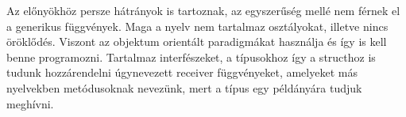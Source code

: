 Az előnyökhöz persze hátrányok is tartoznak, az egyszerűség mellé nem férnek el a generikus függvények.
Maga a nyelv nem tartalmaz osztályokat, illetve nincs öröklődés.
Viszont az objektum orientált paradigmákat használja és így is kell benne programozni.
Tartalmaz interfészeket, a típusokhoz így a structhoz is tudunk hozzárendelni úgynevezett receiver függvényeket, amelyeket más nyelvekben metódusoknak nevezünk, mert a típus egy példányára tudjuk meghívni.

